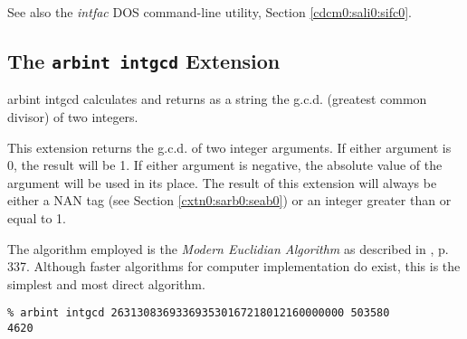 \begin{tclcommandseealso}
See also the \emph{intfac} DOS command-line utility, 
Section \ref{cdcm0:sali0:sifc0}.
\end{tclcommandseealso}


\subsection{The \texttt{arbint intgcd} Extension}
\label{cxtn0:sarb0:sgcd0}

\begin{tclcommandname}{arbint intgcd}%
calculates and returns as a string the g.c.d. 
(greatest common divisor) of two integers.
\end{tclcommandname}

\begin{tclcommandsynopsis}
\end{tclcommandsynopsis}

\begin{tclcommanddescription}
This extension returns the g.c.d. of two integer arguments.
If either argument is 0, the result will be 1.  If either
argument is negative, the absolute value of the argument
will be used in its place.  The result of this 
extension will always be either a NAN tag
(see Section \ref{cxtn0:sarb0:seab0}) 
or an integer greater than or equal to 1.

The algorithm employed is the
\emph{Modern Euclidian Algorithm} as
described in \cite{bibref:b:knuthclassic2ndedvol2}, p. 337.
Although faster algorithms for computer
implementation do exist, this is the simplest
and most direct algorithm.
\end{tclcommanddescription}

\begin{tclcommandsampleinvocations}
\begin{scriptsize}
\begin{verbatim}
% arbint intgcd 263130836933693530167218012160000000 503580
4620
\end{verbatim}
\end{scriptsize}
\end{tclcommandsampleinvocations}

